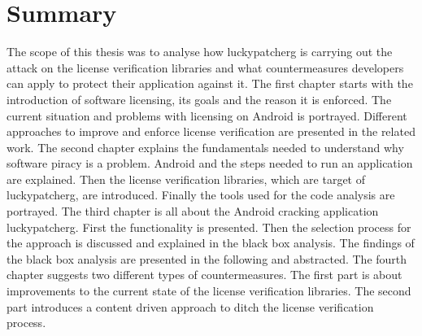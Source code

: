 \section{Summary}\label{section:conclusion-summary}
The scope of this thesis was to analyse how \gls{luckypatcherg} is carrying out the attack on the license verification libraries and what countermeasures developers can apply to protect their application against it.
\newline
\newline
The first chapter starts with the introduction of software licensing, its goals and the reason it is enforced.
The current situation and problems with licensing on Android is portrayed.
Different approaches to improve and enforce license verification are presented in the related work.
\newline
\newline
The second chapter explains the fundamentals needed to understand why software piracy is a problem.
Android and the steps needed to run an application are explained.
Then the license verification libraries, which are target of \gls{luckypatcherg}, are introduced.
Finally the tools used for the code analysis are portrayed.
\newline
\newline
The third chapter is all about the Android cracking application \gls{luckypatcherg}.
First the functionality is presented.
Then the selection process for the approach is discussed and explained in the black box analysis.
The findings of the black box analysis are presented in the following and abstracted.
\newline
\newline
The fourth chapter suggests two different types of countermeasures.
The first part is about improvements to the current state of the license verification libraries.
The second part introduces a content driven approach to ditch the license verification process.
